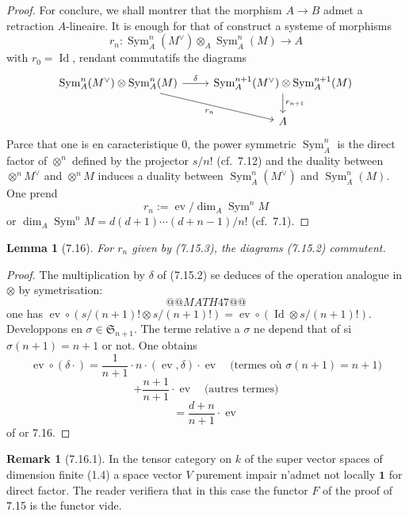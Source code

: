 \documentclass[12pt,a4paper]{article}
\theoremstyle{plain}
\newtheorem{lemma}[theorem]{Lemma}
\theoremstyle{definition}
\newtheorem{remark}[theorem]{Remark}
\DeclareMathOperator{\Id}{Id}
\DeclareMathOperator{\ev}{ev}
\DeclareMathOperator{\Sym}{Sym}
\begin{document}
\begin{proof}
For conclure, we shall montrer that the morphism $A \to B$ admet a retraction $A$-lineaire. It is enough for that of construct a systeme of morphisms
\[
r_n : \Sym^n_A(M^\vee) \otimes_A \Sym^n_A(M) \to A
\]
with $r_0 = \Id$, rendant commutatifs the diagrams
\begin{equation}\label{eq:7.15.2}
\begin{tikzcd}
\Sym^n_A(M^\vee) \otimes \Sym^n_A(M) \arrow[r, "\delta"] \arrow[dr, "r_n"'] & \Sym^{n+1}_A(M^\vee) \otimes \Sym^{n+1}_A(M) \arrow[d, "r_{n+1}"] \\
& A
\end{tikzcd}
\end{equation}
Parce that one is en caracteristique 0, the power symmetric $\Sym^n_A$ is the direct factor of $\otimes^n$ defined by the projector $s/n!$ (cf.~7.12) and the duality between $\otimes^n M^\vee$ and $\otimes^n M$ induces a duality between $\Sym^n_A(M^\vee)$ and $\Sym^n_A(M)$. One prend
\begin{equation}\label{eq:7.15.3}
r_n := \ev / \dim_A \Sym^n M
\end{equation}
or $\dim_A \Sym^n M = d(d+1) \cdots (d+n-1)/n!$ (cf.~7.1).
\end{proof}

\begin{lemma}[7.16]
For $r_n$ given by (7.15.3), the diagrams (7.15.2) commutent.
\end{lemma}

\begin{proof}
The multiplication by $\delta$ of (7.15.2) se deduces of the operation analogue in $\otimes$ by symetrisation:
\[
@@MATH47@@
\]
one has $\ev \circ (s/(n+1)! \otimes s/(n+1)!) = \ev \circ (\Id \otimes s/(n+1)!)$. Developpons en $\sigma \in \mathfrak{S}_{n+1}$. The terme relative a $\sigma$ ne depend that of si $\sigma(n+1) = n+1$ or not. One obtains
\[
\ev \circ (\delta \cdot) = \frac{1}{n+1} \cdot n \cdot (\ev, \delta) \cdot \ev \quad \text{(termes où $\sigma(n+1) = n+1$)}
\]
\[
+ \frac{n+1}{n+1} \cdot \ev \quad \text{(autres termes)}
\]
\[
= \frac{d+n}{n+1} \cdot \ev
\]
of or 7.16.
\end{proof}

\begin{remark}[7.16.1]
In the tensor category on $k$ of the super vector spaces of dimension finite (1.4) a space vector $V$ purement impair n'admet not locally $\mathbf{1}$ for direct factor. The reader verifiera that in this case the functor $F$ of the proof of 7.15 is the functor vide.
\end{remark}
\end{document}
